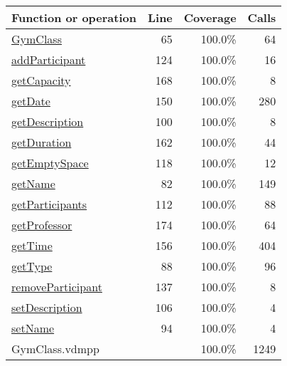 \bigskip
\begin{longtable}{|l|r|r|r|}
\hline
Function or operation & Line & Coverage & Calls \\
\hline
\hline
\hyperref[GymClass:65]{GymClass} & 65&100.0\% & 64 \\
\hline
\hyperref[addParticipant:124]{addParticipant} & 124&100.0\% & 16 \\
\hline
\hyperref[getCapacity:168]{getCapacity} & 168&100.0\% & 8 \\
\hline
\hyperref[getDate:150]{getDate} & 150&100.0\% & 280 \\
\hline
\hyperref[getDescription:100]{getDescription} & 100&100.0\% & 8 \\
\hline
\hyperref[getDuration:162]{getDuration} & 162&100.0\% & 44 \\
\hline
\hyperref[getEmptySpace:118]{getEmptySpace} & 118&100.0\% & 12 \\
\hline
\hyperref[getName:82]{getName} & 82&100.0\% & 149 \\
\hline
\hyperref[getParticipants:112]{getParticipants} & 112&100.0\% & 88 \\
\hline
\hyperref[getProfessor:174]{getProfessor} & 174&100.0\% & 64 \\
\hline
\hyperref[getTime:156]{getTime} & 156&100.0\% & 404 \\
\hline
\hyperref[getType:88]{getType} & 88&100.0\% & 96 \\
\hline
\hyperref[removeParticipant:137]{removeParticipant} & 137&100.0\% & 8 \\
\hline
\hyperref[setDescription:106]{setDescription} & 106&100.0\% & 4 \\
\hline
\hyperref[setName:94]{setName} & 94&100.0\% & 4 \\
\hline
\hline
GymClass.vdmpp & & 100.0\% & 1249 \\
\hline
\end{longtable}

